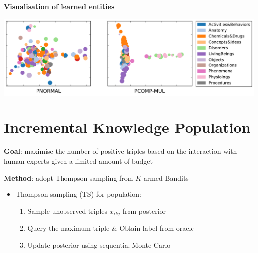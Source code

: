 \documentclass[a0,landscape]{a0poster}
\begin{document}
\begin{multicols}{3}
%
%


\begin{center}
\noindent\textbf{Visualisation of learned entities}
\vspace{.5cm}

\includegraphics[width=0.9\linewidth]{../cikm2016/images/embedding_umls.pdf}
\end{center}


\section{Incremental Knowledge Population}
\textbf{Goal}: maximise the number of positive triples based on the interaction with human experts given a limited amount of budget

\noindent \textbf{Method}: adopt Thompson sampling from $K$-armed Bandits

\begin{itemize}
\item Thompson sampling (TS) for population:
\begin{enumerate}
\item Sample unobserved triples $x_{ikj}$ from posterior
\item Query the maximum triple \& Obtain label from oracle
\item Update posterior using sequential Monte Carlo
\end{enumerate}
\end{itemize}


\end{multicols}
\end{document}
